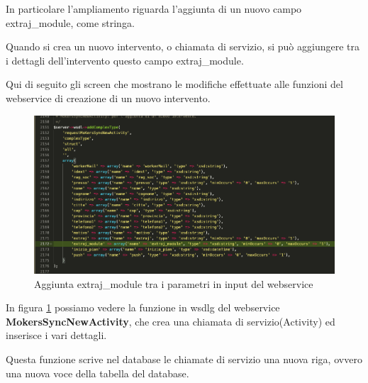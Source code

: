 \begin{flushleft}
	In particolare l'ampliamento riguarda l'aggiunta di un nuovo campo extraj\_module, come  stringa.
	
	Quando si crea un nuovo intervento, o chiamata di servizio, si può aggiungere tra i dettagli dell'intervento questo campo extraj\_module.
	
	Qui di seguito gli screen che mostrano le modifiche effettuate alle funzioni del webservice di creazione di un nuovo intervento.
\end{flushleft}
\newspace
\begin{figure}[!h] 
	\centering
	\includegraphics[scale = 0.4]{immagini/webservices/ampliamenti/2ampl_prototipo_types.png}
	\caption{Aggiunta extraj\_module tra i parametri in input del webservice}
	\label{fig:5-4}
\end{figure}
\newspace
\begin{flushleft}
	In figura \ref{fig:5-4} possiamo vedere la funzione in \gls{wsdlg} del webservice \textbf{MokersSyncNewActivity}, che crea una chiamata di servizio(Activity) ed inserisce i vari dettagli. 
	
	Questa funzione scrive nel database le chiamate di servizio una nuova riga, ovvero una nuova voce della tabella del database.
\end{flushleft}

\newpage

